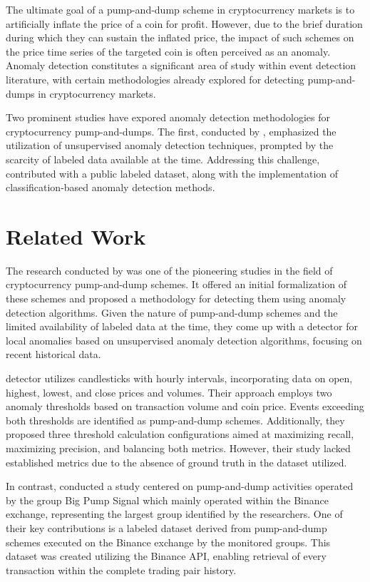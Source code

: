 \documentclass[12pt]{article}
\begin{document}
	The ultimate goal of a pump-and-dump scheme in cryptocurrency markets is to artificially inflate the price of a coin for profit.
	However, due to the brief duration during which they can sustain the inflated price, the impact of such schemes on the price time series of the targeted coin is often perceived as an anomaly.
	Anomaly detection constitutes a significant area of study within event detection literature, with certain methodologies already explored for detecting pump-and-dumps in cryptocurrency markets.

	Two prominent studies have expored anomaly detection methodologies for cryptocurrency pump-and-dumps.
	The first, conducted by \citet{kamps2018}, emphasized the utilization of unsupervised anomaly detection techniques, prompted by the scarcity of labeled data available at the time.
	Addressing this challenge, \citet{lamorgia2020} contributed with a public labeled dataset, along with the implementation of classification-based anomaly detection methods.

	\section{Related Work}
	\label{sec_trab_relacionados}

	The research conducted by \citet{kamps2018} was one of the pioneering studies in the field of cryptocurrency pump-and-dump schemes.
	It offered an initial formalization of these schemes and proposed a methodology for detecting them using anomaly detection algorithms.
	Given the nature of pump-and-dump schemes and the limited availability of labeled data at the time, they come up with a detector for local anomalies based on unsupervised anomaly detection algorithms, focusing on recent historical data.

	\citet{kamps2018} detector utilizes candlesticks with hourly intervals, incorporating data on open, highest, lowest, and close prices and volumes.
	Their approach employs two anomaly thresholds based on transaction volume and coin price.
	Events exceeding both thresholds are identified as pump-and-dump schemes.
	Additionally, they proposed three threshold calculation configurations aimed at maximizing recall, maximizing precision, and balancing both metrics.
	However, their study lacked established metrics due to the absence of ground truth in the dataset utilized.

	In contrast, \citet{lamorgia2020} conducted a study centered on pump-and-dump activities operated by the group Big Pump Signal which mainly operated within the Binance exchange, representing the largest group identified by the researchers.
	One of their key contributions is a labeled dataset derived from pump-and-dump schemes executed on the Binance exchange by the monitored groups.
	This dataset was created utilizing the Binance API, enabling retrieval of every transaction within the complete trading pair history.
\end{document}

